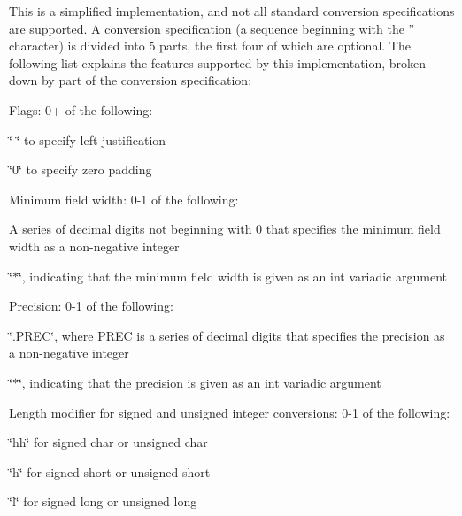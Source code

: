 This is a simplified implementation, and not all standard conversion specifications are supported. A conversion specification (a sequence beginning with the {\ttfamily ''} character) is divided into 5 parts, the first four of which are optional. The following list explains the features supported by this implementation, broken down by part of the conversion specification\-:


\begin{DoxyEnumerate}
\item Flags\-: 0+ of the following\-:
\begin{DoxyItemize}
\item {\ttfamily \char`\"{}-\/\char`\"{}} to specify left-\/justification
\item {\ttfamily \char`\"{}0\char`\"{}} to specify zero padding
\end{DoxyItemize}
\item Minimum field width\-: 0-\/1 of the following\-:
\begin{DoxyItemize}
\item A series of decimal digits not beginning with 0 that specifies the minimum field width as a non-\/negative integer
\item {\ttfamily \char`\"{}$\ast$\char`\"{}}, indicating that the minimum field width is given as an {\ttfamily int} variadic argument
\end{DoxyItemize}
\item Precision\-: 0-\/1 of the following\-:
\begin{DoxyItemize}
\item {\ttfamily \char`\"{}.\-P\-R\-E\-C\char`\"{}}, where {\ttfamily P\-R\-E\-C} is a series of decimal digits that specifies the precision as a non-\/negative integer
\item {\ttfamily \char`\"{}$\ast$\char`\"{}}, indicating that the precision is given as an {\ttfamily int} variadic argument
\end{DoxyItemize}
\item Length modifier for signed and unsigned integer conversions\-: 0-\/1 of the following\-:
\begin{DoxyItemize}
\item {\ttfamily \char`\"{}hh\char`\"{}} for {\ttfamily signed char} or {\ttfamily unsigned char}
\item {\ttfamily \char`\"{}h\char`\"{}} for {\ttfamily signed short} or {\ttfamily unsigned short}
\item {\ttfamily \char`\"{}l\char`\"{}} for {\ttfamily signed long} or {\ttfamily unsigned long}

\end{DoxyItemize}
\end{DoxyEnumerate}
